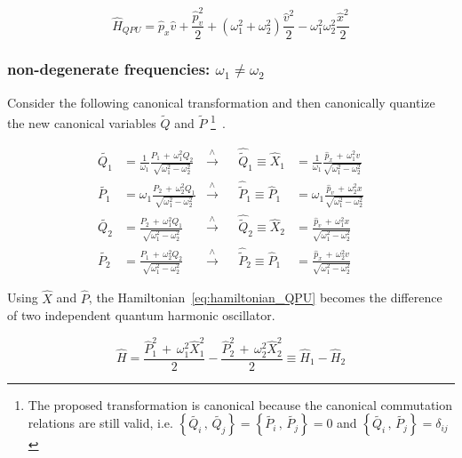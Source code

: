 \begin{equation} \label{eq:hamiltonian_QPU}
  \hat{H}_{QPU} = \hat{p}_x \hat{v} + \frac{\hat{p}_v^2}{2}
  + \left(\omega_1^2 + \omega_2^2\right)\frac{\hat{v}^2}{2}
  - \omega_1^2\omega_2^2 \frac{\hat{x}^2}{2}
\end{equation}

\subsubsection{non-degenerate frequencies: $\omega_1 \neq \omega_2$}

Consider the following canonical transformation and then canonically quantize
the new canonical variables $\tilde{Q}$ and $\tilde{P}$
\footnote{
  The proposed transformation is canonical because the canonical commutation
  relations are still valid, i.e.
  $\left\{ \tilde{Q_i} \, , \, \tilde{Q_j}\right\} =
  \left\{ \tilde{P_i} \, , \, \tilde{P_j}\right\} = 0$ and
  $\left\{ \tilde{Q_i} \, , \, \tilde{P_j}\right\} = \delta_{ij}$
}~\cite{Mannheim05}.

\begin{align*}
  \tilde{Q_1} &= \frac{1}{\omega_1}
    \frac{P_1 \, + \,  \omega_1^2 Q_2} {\sqrt{\omega_1^2-\omega_2^2}}
              &\xrightarrow{\wedge}& &\hat{\tilde{Q}}_1 \equiv
  \hat{X}_1 &= \frac{1}{\omega_1}
    \frac{\hat{p}_x \, + \,  \omega_1^2 v} {\sqrt{\omega_1^2-\omega_2^2}}
    \\
  \tilde{P_1} &= \omega_1
    \frac{P_2 \, + \, \omega_2^2 Q_1} {\sqrt{\omega_1^2-\omega_2^2}}
              &\xrightarrow{\wedge}& &\hat{\tilde{P}}_1 \equiv
    \hat{P}_1 &= \omega_1
    \frac{\hat{p}_v \, + \,  \omega_2^2 x} {\sqrt{\omega_1^2-\omega_2^2}}
    \\
  \tilde{Q_2} &=
    \frac{P_2 \, + \,  \omega_1^2 Q_1} {\sqrt{\omega_1^2-\omega_2^2}}
              &\xrightarrow{\wedge}& &\hat{\tilde{Q}}_2 \equiv
  \hat{X}_2 &=
    \frac{\hat{p}_v \, + \,  \omega_1^2 x} {\sqrt{\omega_1^2-\omega_2^2}}
    \\
  \tilde{P_2} &=
    \frac{P_1 \, + \, \omega_2^2 Q_2} {\sqrt{\omega_1^2-\omega_2^2}}
              &\xrightarrow{\wedge}& &\hat{\tilde{P}}_2 \equiv
  \hat{P}_1 &=
    \frac{\hat{p}_x \, + \,  \omega_2^2 v} {\sqrt{\omega_1^2-\omega_2^2}}
\end{align*}

Using $\hat{X}$ and $\hat{P}$, the Hamiltonian~\eqref{eq:hamiltonian_QPU}
becomes the difference of two independent quantum harmonic oscillator.

\begin{equation}
  \hat{H} =
  \frac{\hat{P}_1^2 \, + \, \omega_1^2 \hat{X}_1^2}{2} -
  \frac{\hat{P}_2^2 \, + \, \omega_2^2 \hat{X}_2^2}{2} \equiv
  \hat{H}_1 - \hat{H}_2
\end{equation}

